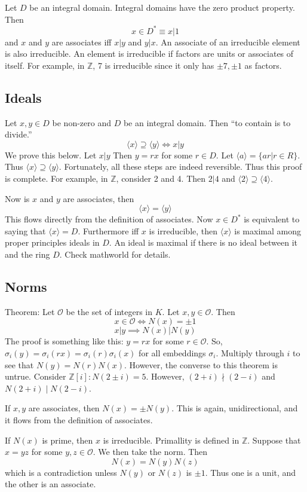 \documentclass{article}
\begin{document}
Let $D$ be an integral domain. Integral domains have the zero product property.
Then
\[ x \in D^* \equiv x | 1 \]
and $x$ and $y$ are associates iff $x|y$ and $y|x$. An associate of an
irreducible element is also irreducible. An element is irreducible if factors
are units or associates of itself. For example, in $\mathbb{Z}$, 7 is
irreducible since it only has $\pm 7, \pm 1$ as factors. 

\subsection{Ideals}
Let $x,y \in D$ be non-zero and $D$ be an integral domain. Then ``to contain is
to divide.'' 
\[ \langle x \rangle \supseteq \langle y \rangle \Leftrightarrow x | y \]
We prove this below. Let $x|y$ Then $y = rx$ for some $r \in D$. Let $\langle a
\rangle = \{ ar| r \in R \}$. Thus $\langle x \rangle \supseteq \langle y
\rangle$. Fortunately, all these steps are indeed reversible. Thus this proof is
complete. For example, in $\mathbb{Z}$, consider 2 and 4. Then $2|4$ and
$\langle 2 \rangle \supseteq \langle 4 \rangle $. 

Now is $x$ and $y$ are associates, then 
\[ \langle x \rangle = \langle y \rangle \]
This flows directly from the definition of associates. Now $x \in D^*$ is
equivalent to saying that $\langle x \rangle = D$. Furthermore iff $x$ is
irreducible, then $\langle x \rangle$ is maximal among proper principles ideals
in $D$. An ideal is maximal if there is no ideal between it and the ring $D$.
Check mathworld for details. 

\subsection{Norms}
Theorem: Let $\mathcal{O}$ be the set of integers in $K$. Let $x,y \in
\mathcal{O}$. Then
\[x \in \mathcal{O} \iff N(x) = \pm 1 \]
\[ x|y \implies N(x) | N(y) \]
The proof is something like this: $y = rx$ for some $r \in \mathcal{O}$. So,
$\sigma_i(y) = \sigma_i(rx) = \sigma_i(r) \sigma_i(x)$ for all embeddings
$\sigma_i$. Multiply through $i$ to see that $N(y) = N(r) N(x)$. However, the
converse to this theorem is untrue. Consider $\mathbb{Z}[i] : N(2 \pm i) = 5$.
However, $(2+i) \nmid (2-i)$ and $N(2+i) \mid N(2-i)$. 

If $x,y$ are associates, then $N(x) = \pm N(y)$. This is again, unidirectional,
and it flows from the definition of associates. 

If $N(x)$ is prime, then $x$ is irreducible. Primallity is defined in
$\mathbb{Z}$. Suppose that $x = yz$ for some $y,z\in \mathcal{O}$. We then take
the norm. Then
\[ N(x) = N(y) N(z) \] 
which is a contradiction unless $N(y)$ or $N(z)$ is $\pm 1$. Thus one is a unit,
and the other is an associate. 
\end{document}
